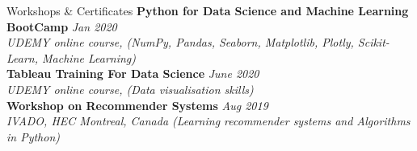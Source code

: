 \documentclass{resume} %
\begin{document}
\begin{rSection}{Workshops \& Certificates}
 {\bf Python for Data Science and Machine Learning BootCamp } \hfill {\em Jan 2020} \\ 
\textit{UDEMY online course, (NumPy, Pandas, Seaborn, Matplotlib, Plotly, Scikit-Learn, Machine Learning)}\hfill \\
 {\bf Tableau Training For Data Science} \hfill {\em June 2020} \\ 
\textit{UDEMY online course, (Data visualisation skills)}\hfill \\
 {\bf Workshop on Recommender Systems } \hfill {\em Aug 2019} \\ 
\textit{IVADO, HEC Montreal, Canada (Learning recommender systems and Algorithms in Python)}\hfill  
 
\end{rSection} 

 
\end{document}

